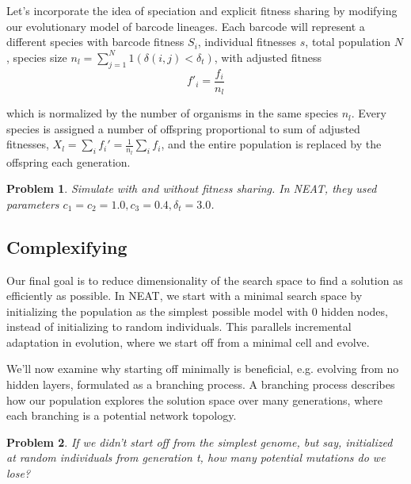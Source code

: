 \documentclass[12pt]{article}
\newtheorem{problem}{Problem}
\begin{document}
Let's incorporate the idea of speciation and explicit fitness sharing by modifying our evolutionary model of barcode lineages. Each barcode will represent a different species with barcode fitness $S_i$, individual fitnesses $s$, total population $N$, species size $n_l=\sum_{j=1}^{N} 1(\delta(i,j)<\delta_t)$, with adjusted fitness
$$f'_i=\frac{f_i}{n_l}$$

which is normalized by the number of organisms in the same species $n_l$. Every species is assigned a number of offspring proportional to sum of adjusted fitnesses, $X_l=\sum_i f_i'=\frac{1}{n_l}\sum_i f_i$, and the entire population is replaced by the offspring each generation.

\begin{problem} Simulate with and without fitness sharing. In NEAT, they used parameters $c_1=c_2=1.0,c_3=0.4,\delta_t=3.0$.
\end{problem}

\subsection{Complexifying}


Our final goal is to reduce dimensionality of the search space to find a solution as efficiently as possible. In NEAT, we start with a minimal search space by initializing the population as the simplest possible model with 0 hidden nodes, instead of initializing to random individuals. This parallels incremental adaptation in evolution, where we start off from a minimal cell and evolve.

We'll now examine why starting off minimally is beneficial, e.g. evolving from no hidden layers, formulated as a branching process. A branching process describes how our population explores the solution space over many generations, where each branching is a potential network topology.


\begin{problem}
If we didn't start off from the simplest genome, but say, initialized at random individuals from generation t, how many potential mutations do we lose?
\end{problem}
\end{document}
